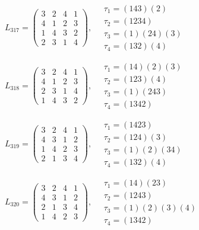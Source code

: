 $L_{317} = \begin{pmatrix} 3 & 2 & 4 & 1 \\ 4 & 1 & 2 & 3 \\ 1 & 4 & 3 & 2 \\ 2 & 3 & 1 & 4 \end{pmatrix}, \quad \begin{matrix} \tau_{1} = (1 4 3)(2) \\ \tau_{2} = (1 2 3 4) \\ \tau_{3} = (1)(2 4)(3) \\ \tau_{4} = (1 3 2)(4) \end{matrix}$

$L_{318} = \begin{pmatrix} 3 & 2 & 4 & 1 \\ 4 & 1 & 2 & 3 \\ 2 & 3 & 1 & 4 \\ 1 & 4 & 3 & 2 \end{pmatrix}, \quad \begin{matrix} \tau_{1} = (1 4)(2)(3) \\ \tau_{2} = (1 2 3)(4) \\ \tau_{3} = (1)(2 4 3) \\ \tau_{4} = (1 3 4 2) \end{matrix}$

$L_{319} = \begin{pmatrix} 3 & 2 & 4 & 1 \\ 4 & 3 & 1 & 2 \\ 1 & 4 & 2 & 3 \\ 2 & 1 & 3 & 4 \end{pmatrix}, \quad \begin{matrix} \tau_{1} = (1 4 2 3) \\ \tau_{2} = (1 2 4)(3) \\ \tau_{3} = (1)(2)(3 4) \\ \tau_{4} = (1 3 2)(4) \end{matrix}$

$L_{320} = \begin{pmatrix} 3 & 2 & 4 & 1 \\ 4 & 3 & 1 & 2 \\ 2 & 1 & 3 & 4 \\ 1 & 4 & 2 & 3 \end{pmatrix}, \quad \begin{matrix} \tau_{1} = (1 4)(2 3) \\ \tau_{2} = (1 2 4 3) \\ \tau_{3} = (1)(2)(3)(4) \\ \tau_{4} = (1 3 4 2) \end{matrix}$

